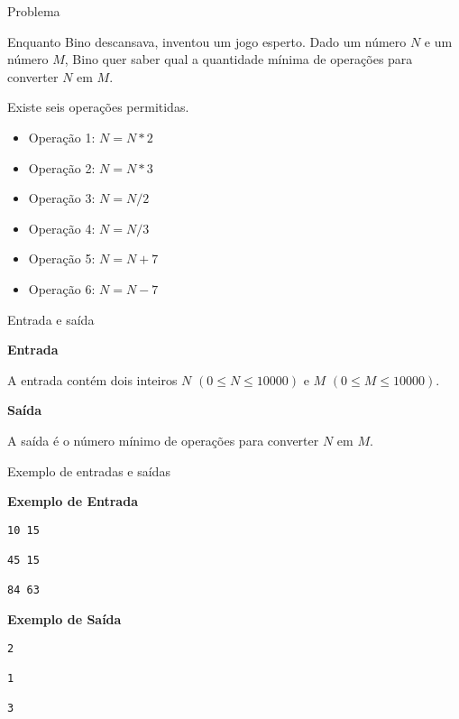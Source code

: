 
\begin{frame}[fragile]{Problema}

Enquanto Bino descansava, inventou um jogo esperto. Dado um número $N$ e um número $M$, Bino quer 
saber qual a quantidade mínima de operações para converter $N$ em $M$.

Existe seis operações permitidas.

\begin{itemize}
    \item Operação 1: $N = N*2$
    \item Operação 2: $N = N*3$
    \item Operação 3: $N = N/2$
    \item Operação 4: $N = N/3$
    \item Operação 5: $N = N+7$
    \item Operação 6: $N = N-7$
\end{itemize}

\end{frame}

\begin{frame}[fragile]{Entrada e saída}

\textbf{Entrada}

A entrada contém dois inteiros $N$ $(0\leq N\leq 10000)$ e $M$ $(0\leq M\leq 10000)$.

\vspace{0.2in}

\textbf{Saída}

A saída é o número mínimo de operações para converter $N$ em $M$.

\end{frame}

\begin{frame}[fragile]{Exemplo de entradas e saídas}

\begin{minipage}[t]{0.5\textwidth}
\textbf{Exemplo de Entrada}
\begin{verbatim}
10 15

45 15

84 63
\end{verbatim}
\end{minipage}
\begin{minipage}[t]{0.45\textwidth}
\textbf{Exemplo de Saída}
\begin{verbatim}
2

1

3
\end{verbatim}
\end{minipage}
\end{frame}

